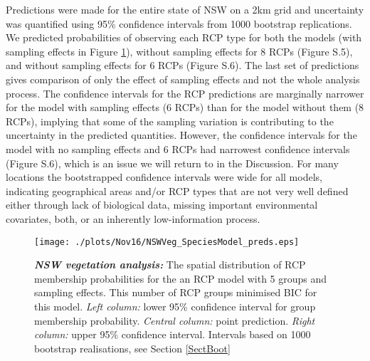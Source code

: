 \documentclass{statsoc}
\begin{document}
Predictions were made for the entire state of NSW on a 2km grid and uncertainty was quantified using 95\% confidence intervals from 1000 bootstrap replications. We predicted probabilities of observing each RCP type for both the models (with sampling effects in Figure \ref{NSWVegRCP5Map}), without sampling effects for 8 RCPs (Figure S.5), and without sampling effects for 6 RCPs (Figure S.6). The last set of predictions gives comparison of only the effect of sampling effects and not the whole analysis process. The confidence intervals for the RCP predictions are marginally narrower for the model with sampling effects (6 RCPs) than for the model without them (8 RCPs), implying that some of the sampling variation is contributing to the uncertainty in the predicted quantities. However, the confidence intervals for the model with no sampling effects and 6 RCPs had narrowest confidence intervals (Figure S.6), which is an issue we will return to in the Discussion. For many locations the bootstrapped confidence intervals were wide for all models, indicating geographical areas and/or RCP types that are not very well defined either through lack of biological data, missing important environmental covariates, both, or an inherently low-information process. \begin{figure}
	\centering
	\texttt{[image: ./plots/Nov16/NSWVeg\_SpeciesModel\_preds.eps]}
	\caption{\label{NSWVegRCP5Map}\textbf{\textit{NSW vegetation analysis:}} The spatial distribution of RCP membership probabilities for the an RCP model with 5 groups and sampling effects. This number of RCP groups minimised BIC for this model. \textit{Left column:} lower 95\% confidence interval for group membership probability. \textit{Central column:} point prediction. \textit{Right column:} upper 95\% confidence interval. Intervals based on 1000 bootstrap realisations, see Section \ref{SectBoot}}
\end{figure}
\end{document}
